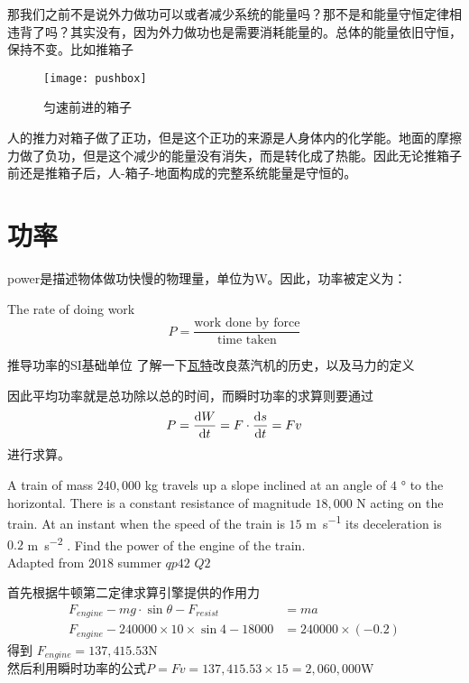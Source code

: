 那我们之前不是说外力做功可以或者减少系统的能量吗？那不是和能量守恒定律相违背了吗？其实没有，因为外力做功也是需要消耗能量的。总体的能量依旧守恒，保持不变。比如推箱子
\begin{figure}[H]
\centering
\texttt{[image: pushbox]}
\caption{匀速前进的箱子}
\end{figure}
人的推力对箱子做了正功，但是这个正功的来源是人身体内的化学能。地面的摩擦力做了负功，但是这个减少的能量没有消失，而是转化成了热能。因此无论推箱子前还是推箱子后，人-箱子-地面构成的完整系统能量是守恒的。
\clearpage

\section{功率}
\gls{power}是描述物体做功快慢的物理量，单位为\si{\W}。因此，功率被定义为：
\begin{definition}
The rate of doing work\\
\[
	P=\frac{\text{work done by force}}{\text{time taken}}
\]
\end{definition}

\begin{TaskBox}
推导功率的SI基础单位
\tcblower
了解一下\href{https://mp.weixin.qq.com/s/tpszxZu7VZMLdc4Gpit49A}{瓦特}改良蒸汽机的历史，以及马力的定义
\end{TaskBox}

因此平均功率就是总功除以总的时间，而瞬时功率的求算则要通过 
\[
	P=\frac{{\mathrm{d}} W}{{\mathrm{d}} t}=F\cdot \frac{{\mathrm{d}} s}{{\mathrm{d}} t}=Fv
\]
进行求算。


\begin{ExampleBox}
A train of mass $240,000$ \si{\kg} travels up a slope inclined at an angle of $4$ \si{\degree} to the horizontal. There is a constant resistance of magnitude $18,000$ \si{\N} acting on the train. At an instant when the speed of the train is $15$ \si{\m\per\s} its deceleration is $0.2$ \si{\m\per\square\s} . Find the power of the engine of the train.\\
\makebox{}\hfill Adapted from $2018$ summer $qp42$ $Q2$

\tcblower
首先根据牛顿第二定律求算引擎提供的作用力
\begin{align*}
F_{engine}-mg\cdot\sin\theta - F_{resist} &=ma\\
F_{engine}-240000 \times 10 \times \sin 4-18000 &=240000\times (-0.2)
\end{align*}
得到 $F_{engine}=137,415.53$\si{\N}\\
然后利用瞬时功率的公式$P=Fv=137,415.53\times 15 =2,060,000$\si{\watt}
\end{ExampleBox}